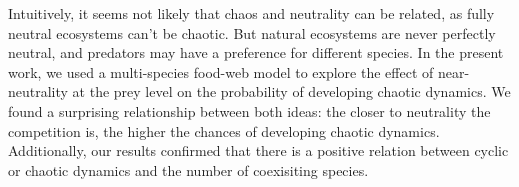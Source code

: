 Intuitively, it seems not likely that chaos and neutrality can be related, as fully neutral ecosystems can't be chaotic. But natural ecosystems are never perfectly neutral, and predators may have a preference for different species. In the present work, we used a multi-species food-web model to explore the effect of near-neutrality at the prey level on the probability of developing chaotic dynamics. We found a surprising relationship between both ideas: the closer to neutrality the competition is, the higher the chances of developing chaotic dynamics. Additionally, our results confirmed that there is a positive relation between cyclic or chaotic dynamics and the number of coexisiting species.
